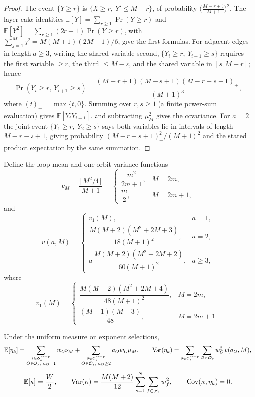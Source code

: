 \begin{proof}
The event $\{Y\geq r\}$ is $\{X\geq r,\ Y'\leq M-r\}$, of probability
$\bigl(\frac{M-r+1}{M+1}\bigr)^2$.  The layer-cake identities
$\mathbb{E}[Y]=\sum_{r\geq1}\Pr(Y\geq r)$ and
$\mathbb{E}[Y^2]=\sum_{r\geq1}(2r-1)\Pr(Y\geq r)$, with
$\sum_{j=1}^{M}j^2=M(M+1)(2M+1)/6$, give the first formulas.
For adjacent edges in length $a\geq3$, writing the shared variable second,
$\{Y_i\geq r,\ Y_{i+1}\geq s\}$ requires the first variable $\geq r$, the
third $\leq M-s$, and the shared variable in $[s,M-r]$; hence
\[
\Pr(Y_i\geq r,\,Y_{i+1}\geq s)
 =\frac{(M-r+1)(M-s+1)(M-r-s+1)_+}{(M+1)^3},
\]
where $(t)_+=\max\{t,0\}$.  Summing over $r,s\geq1$ (a finite power-sum
evaluation) gives $\mathbb{E}[Y_iY_{i+1}]$, and subtracting $\mu_M^2$ gives
the covariance.  For $a=2$ the joint event
$\{Y_1\geq r,\ Y_2\geq s\}$ says both variables lie in intervals of length
$M-r-s+1$, giving probability $(M-r-s+1)_+^2/(M+1)^2$ and the stated product
expectation by the same summation.
\end{proof}

Define the loop mean and one-orbit variance functions
\[
\nu_M=\frac{\lfloor M^2/4\rfloor}{M+1}
 =\begin{cases}
   \dfrac{m^2}{2m+1},&M=2m,\\[4pt] \dfrac{m}{2},&M=2m+1,
  \end{cases}
\]
and
{\small
\[
v(a,M)=
\begin{cases}
v_1(M), & a=1,\\[2pt]
\dfrac{M(M+2)(M^2+2M+3)}{18(M+1)^2}, & a=2,\\[6pt]
a\,\dfrac{M(M+2)(M^2+2M+2)}{60(M+1)^2}, & a\geq3,
\end{cases}
\]
}
where
{\small
\[
v_1(M)=
\begin{cases}
\dfrac{M(M+2)(M^2+2M+4)}{48(M+1)^2},&M=2m,\\[6pt]
\dfrac{(M-1)(M+3)}{48},&M=2m+1.
\end{cases}
\]
}

\begin{proposition}\label{prop:moments}
Under the uniform measure on exponent selections,
{\small
\[
\mathbb{E}[\eta_k]
 =\sum_{\substack{s\in\mathcal{S}_k^{\mathrm{comp}}\\ O\in\Os,\ a_O=1}}
    w_O\nu_M
  +\sum_{\substack{s\in\mathcal{S}_k^{\mathrm{comp}}\\ O\in\Os,\ a_O\geq2}}
    a_Ow_O\mu_M,
\qquad
\operatorname{Var}(\eta_k)
 =\sum_{s\in\mathcal{S}_k^{\mathrm{comp}}}\sum_{O\in\Os}
    w_O^2\,v(a_O,M),
\]
}
\[
\mathbb{E}[\kappa]=\frac{W}{2},\qquad
\operatorname{Var}(\kappa)
 =\frac{M(M+2)}{12}\sum_{s=1}^{N}\sum_{f\in\mathcal F_s}w_f^2,\qquad
\operatorname{Cov}(\kappa,\eta_k)=0.
\]
\end{proposition}

